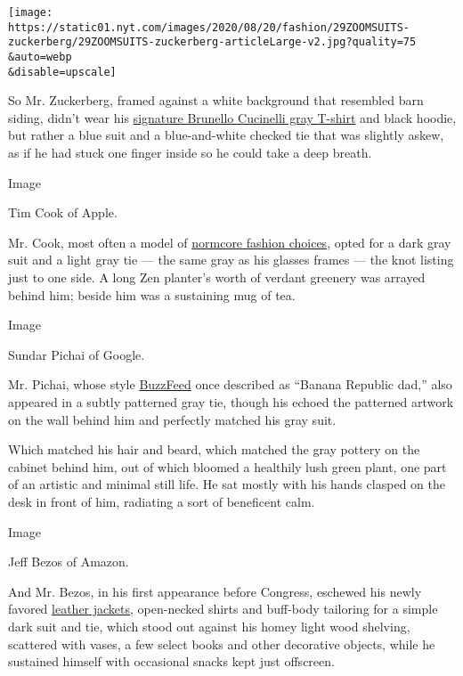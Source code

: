\texttt{[image: https://static01.nyt.com/images/2020/08/20/fashion/29ZOOMSUITS-zuckerberg/29ZOOMSUITS-zuckerberg-articleLarge-v2.jpg?quality=75\\\&auto=webp\\\&disable=upscale]}

So Mr. Zuckerberg, framed against a white background that resembled barn
siding, didn't wear his
\href{https://runway.blogs.nytimes.com/2014/11/12/mark-zuckerberg-adopts-obamas-approach-to-dressing/}{signature
Brunello Cucinelli gray T-shirt} and black hoodie, but rather a blue
suit and a blue-and-white checked tie that was slightly askew, as if he
had stuck one finger inside so he could take a deep breath.

Image

Tim Cook of Apple.

Mr. Cook, most often a model of
\href{https://www.nytimes.com/2014/10/16/fashion/for-tim-cook-of-apple-the-fashion-of-no-fashion.html}{normcore
fashion choices}, opted for a dark gray suit and a light gray tie ---
the same gray as his glasses frames --- the knot listing just to one
side. A long Zen planter's worth of verdant greenery was arrayed behind
him; beside him was a sustaining mug of tea.

Image

Sundar Pichai of Google.

Mr. Pichai, whose style
\href{https://www.buzzfeednews.com/article/mathonan/searching-for-google-ceo-sundar-pichai-the-most-powerful-tec\#.pp4M4prlM}{BuzzFeed}
once described as ``Banana Republic dad,'' also appeared in a subtly
patterned gray tie, though his echoed the patterned artwork on the wall
behind him and perfectly matched his gray suit.

Which matched his hair and beard, which matched the gray pottery on the
cabinet behind him, out of which bloomed a healthily lush green plant,
one part of an artistic and minimal still life. He sat mostly with his
hands clasped on the desk in front of him, radiating a sort of
beneficent calm.

Image

Jeff Bezos of Amazon.

And Mr. Bezos, in his first appearance before Congress, eschewed his
newly favored
\href{https://www.nytimes.com/2018/08/02/style/jeff-bezos-style-icon.html}{leather
jackets}, open-necked shirts and buff-body tailoring for a simple dark
suit and tie, which stood out against his homey light wood shelving,
scattered with vases, a few select books and other decorative objects,
while he sustained himself with occasional snacks kept just offscreen.

